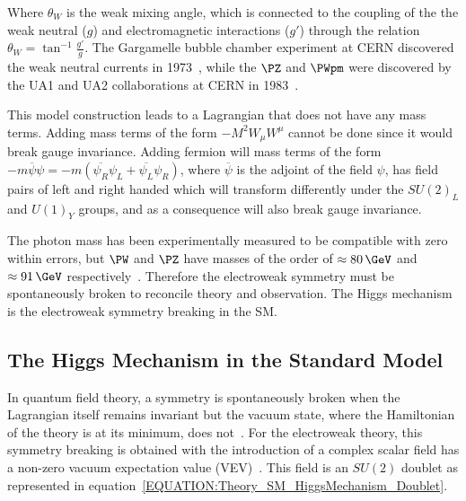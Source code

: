 Where  $\theta_{W}$ is the weak mixing angle, which is connected to the coupling of the the weak neutral ($g$) and electromagnetic interactions ($g'$) through the relation $\theta_{W}=\tan^{-1}{\frac{g'}{g}}$. The Gargamelle bubble chamber experiment at CERN discovered the weak neutral currents in 1973~\cite{ARTICLE:GargamelleNeutrinoObservation}, while the $\PZ$ and $\PWpm$ were discovered by the UA1 and UA2 collaborations at CERN in 1983~\cite{ARTICLE:UA1WObservation,ARTICLE:UA2WObservation,ARTICLE:UA1ZObservation,ARTICLE:UA2ZObservation}.

This model construction leads to a Lagrangian that does not have any mass terms. Adding mass terms of the form $-M^{2}W_{\mu}W^{\mu}$ cannot be done since it would break gauge invariance. Adding fermion will mass terms of the form $-m\overline{\psi}\psi = -m(\overline{\psi_{R}}\psi_{L} + \overline{\psi_{L}}\psi_{R})$, where $\overline\psi$ is the adjoint of the field $\psi$, has field pairs of left and right handed which will transform differently under the $SU(2)_{L}$ and $U(1)_{Y}$ groups, and as a consequence will also break gauge invariance.

The photon mass has been experimentally measured to be compatible with zero within errors, but $\PW$ and $\PZ$ have masses of the order of $\approx 80\,\GeV$ and $\approx91\,\GeV$ respectively~\cite{ARTICLE:PDG2014}. Therefore the electroweak symmetry must be spontaneously broken to reconcile theory and observation. The Higgs mechanism is the electroweak symmetry breaking in the \gls{SM}.

\subsection{The Higgs Mechanism in the Standard Model}
\label{SUBSECTION:Theory_SM_HiggsMechanism}


In quantum field theory, a symmetry is spontaneously broken when the Lagrangian itself remains invariant but the vacuum state, where the Hamiltonian of the theory is at its minimum, does not~\cite{ARTICLE:AitchisonGaugeTheories}. For the electroweak theory, this symmetry breaking is obtained with the introduction of a complex scalar field has a non-zero vacuum expectation value (VEV)~\cite{ARTICLE:HiggsBrokenSymmetries1,ARTICLE:HiggsBrokenSymmetries2,ARTICLE:GlobalConservation,ARTICLE:HiggsSpontaneousSymmetryBreakdown,ARTICLE:SymmetryBreaking}. This field is an $SU(2)$ doublet as represented in equation~\ref{EQUATION:Theory_SM_HiggsMechanism_Doublet}.

